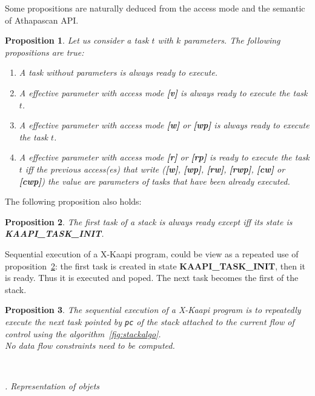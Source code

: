\documentclass[12pt]{report}
\newcommand{\kaapi}{\textsc{X}-Kaapi\xspace}
\renewcommand{\subsubsection}[1]{~\\ \addtocounter{subsubsection}{1} \noindent\textit{
\thesubsubsection. #1\\}}
\newtheorem{proposition}{Proposition}
\begin{document}
Some propositions are naturally deduced from the access mode and the semantic of Athapascan API.
\begin{proposition}
Let us consider a task $t$ with $k$ parameters. The following propositions are true: 
\begin{enumerate} \label{prop1}
\item \label{p1a} A task without parameters is always ready to execute.
\item \label{p1b} A effective parameter with access mode \textbf{[v]} is always ready to execute the task $t$.
\item \label{p1c} A effective parameter with access mode \textbf{[w]} or \textbf{[wp]} is always ready to execute the task $t$.
\item \label{p1d} A effective parameter with access mode \textbf{[r]} or \textbf{[rp]} is ready to execute the task $t$ iff the previous access(es) 
that write (\textbf{[w]}, \textbf{[wp]}, \textbf{[rw]}, \textbf{[rwp]}, \textbf{[cw]} or \textbf{[cwp]}) the value are parameters of tasks that have been already executed. 
\end{enumerate}
\end{proposition}

The following proposition also holds:
\begin{proposition}\label{prop2} 
The first task of a stack is always ready except iff its state is \textbf{KAAPI\_TASK\_INIT}.
\end{proposition}

Sequential execution of a \kaapi program, could be view as a repeated use of proposition~\ref{prop2}: the first task is created in state \textbf{KAAPI\_TASK\_INIT}, then it is ready. Thus it is executed and poped. The next task becomes the first of the stack.
\begin{proposition}
The sequential execution of a \kaapi program is to repeatedly execute the next task pointed by \texttt{pc} of the stack attached to the current flow of control using the algorithm~\ref{fig:stackalgo}.\\
No data flow constraints need to be computed.
\end{proposition}


\subsubsection{Representation of objets}
\end{document}
